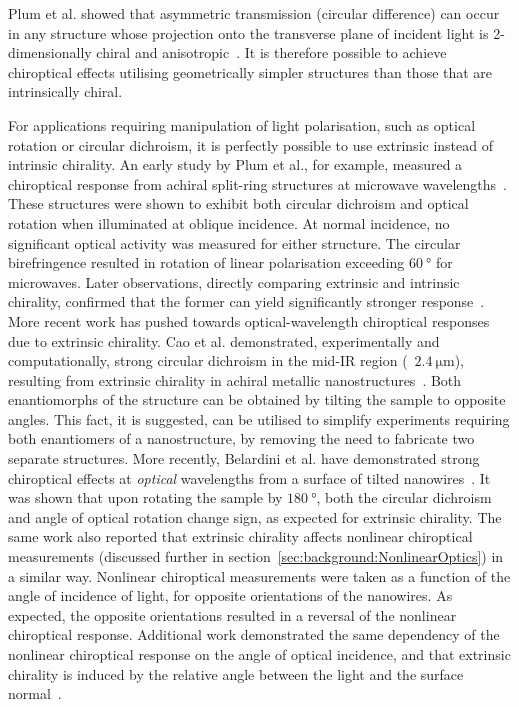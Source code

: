 Plum et al. showed that asymmetric transmission (circular difference) can occur in any structure whose projection onto the transverse plane of incident light is 2-dimensionally chiral and anisotropic~\cite{Plum2011}. It is therefore possible to achieve chiroptical effects utilising geometrically simpler structures than those that are intrinsically chiral.

For applications requiring manipulation of light polarisation, such as optical rotation or circular dichroism, it is perfectly possible to use extrinsic instead of intrinsic chirality. An early study by Plum et al., for example, measured a chiroptical response from achiral split-ring structures at microwave wavelengths~\cite{Plum2009c}. These structures were shown to exhibit both circular dichroism and optical rotation when illuminated at oblique incidence. At normal incidence, no significant optical activity was measured for either structure. The circular birefringence resulted in rotation of linear polarisation exceeding $\SI{60}{\degree}$ for microwaves. Later observations, directly comparing extrinsic and intrinsic chirality, confirmed that the former can yield significantly stronger response~\cite{Maoz2012a}. 
More recent work has pushed towards optical-wavelength chiroptical responses due to extrinsic chirality.
Cao et al. demonstrated, experimentally and computationally, strong circular dichroism in the mid-IR region (~$\SI{2.4}{\micro\m}$), resulting from extrinsic chirality in achiral metallic nanostructures~\cite{Cao2014}. Both enantiomorphs of the structure can be obtained by tilting the sample to opposite angles. This fact, it is suggested, can be utilised to simplify experiments requiring both enantiomers of a nanostructure, by removing the need to fabricate two separate structures.
More recently, Belardini et al. have demonstrated strong chiroptical effects at \textit{optical} wavelengths from a surface of tilted nanowires~\cite{Belardini2016}. It was shown that upon rotating the sample by $\SI{180}{\degree}$, both the circular dichroism and angle of optical rotation change sign, as expected for extrinsic chirality. 
The same work also reported that extrinsic chirality affects nonlinear chiroptical measurements (discussed further in section~\ref{sec:background:NonlinearOptics}) in a similar way. Nonlinear chiroptical measurements were taken as a function of the angle of incidence of light, for opposite orientations of the nanowires. As expected, the opposite orientations resulted in a reversal of the nonlinear chiroptical response. Additional work demonstrated the same dependency of the nonlinear chiroptical response on the angle of optical incidence, and that extrinsic chirality is induced by the relative angle between the light and the surface normal~\cite{Belardini2015}.

